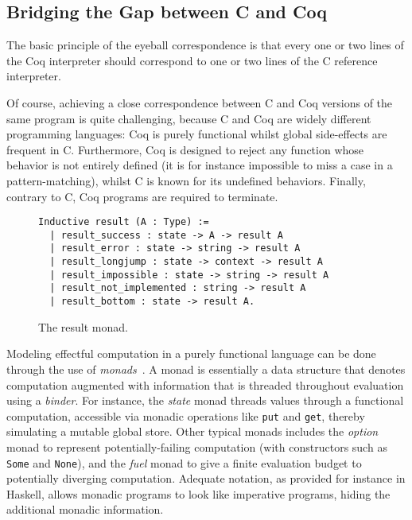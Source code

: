 \documentclass[
    sigplan,
    10pt,
    review, %
    natbib=false %
 ]{acmart}
\newcommand\newtext[1]{{\color{blue} #1}}
\begin{document}
\subsection{Bridging the Gap between C and Coq}
\label{sec:monad}

The basic principle of the eyeball correspondence is that every one or two lines of the Coq interpreter should correspond to one or two lines of the C reference interpreter.

Of course, achieving a close correspondence between C and Coq versions of the same program is quite challenging, because C and Coq are widely different programming languages:
Coq is purely functional
whilst global side-effects are frequent in C.
Furthermore, Coq is designed to reject any function
whose behavior is not entirely defined
(it is for instance impossible to miss a case in a pattern-matching),
whilst C is known for its undefined behaviors.
Finally, contrary to C, Coq programs are required to terminate.

\begin{figure}[t]
\begin{verbatim}
Inductive result (A : Type) :=
  | result_success : state -> A -> result A
  | result_error : state -> string -> result A
  | result_longjump : state -> context -> result A
  | result_impossible : state -> string -> result A
  | result_not_implemented : string -> result A
  | result_bottom : state -> result A.
\end{verbatim}
\vspace{-1em}
\caption{The result monad.}
\label{fig:result}
\end{figure}

\newtext{
Modeling effectful computation in a purely functional language can be done through the use of {\em monads}~\parencite{wadler:mscs1992}. A monad is essentially a data structure that denotes computation augmented with information that is threaded throughout evaluation using a {\em binder}. For instance, the {\em state} monad threads values through a functional computation, accessible via monadic operations like \texttt{put} and \texttt{get}, thereby simulating a mutable global store. Other typical monads includes the {\em option} monad to represent potentially-failing computation (with constructors such as \texttt{Some} and \texttt{None}), and the {\em fuel} monad to give a finite evaluation budget to potentially diverging computation. Adequate notation, as provided for instance in Haskell, allows monadic programs to look like imperative programs, hiding the additional monadic information.
}
\end{document}

